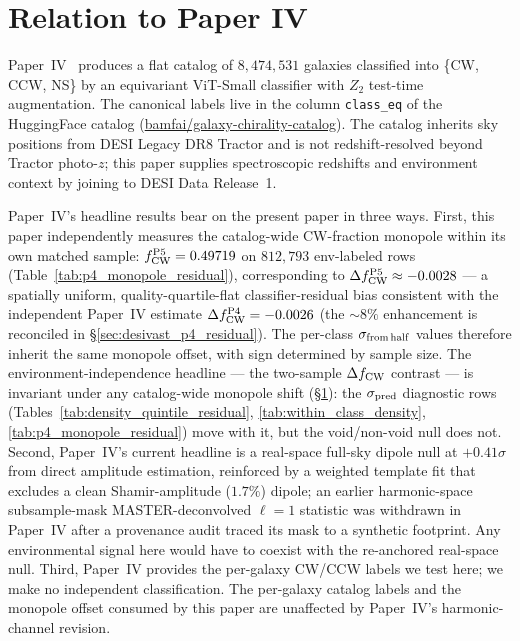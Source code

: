 \documentclass[aps,prd,twocolumn,superscriptaddress,showpacs,preprintnumbers,nofootinbib,longbibliography,floatfix]{revtex4-2}
\begin{document}
\section{Relation to Paper IV}\label{sec:p4}

Paper~IV~\cite{golden_chirality_2026} produces a flat catalog of
$8{,}474{,}531$ galaxies classified into \{CW, CCW, NS\} by an
equivariant ViT-Small classifier with $Z_2$ test-time augmentation.
The canonical labels live in the column \texttt{class\_eq} of the
HuggingFace catalog
(\href{https://huggingface.co/datasets/bamfai/galaxy-chirality-catalog}%
{bamfai/galaxy-chirality-catalog}). The catalog inherits sky positions from
DESI Legacy DR8 Tractor and is not redshift-resolved beyond Tractor
photo-$z$; this paper supplies spectroscopic redshifts and environment
context by joining to DESI Data Release~1.

Paper~IV's headline results bear on the present paper in three ways.
First, this paper independently measures the catalog-wide CW-fraction
monopole within its own matched sample: $f_{\rm CW}^{\rm P5} =
0.49719$ on $812{,}793$ env-labeled rows
(Table~\ref{tab:p4_monopole_residual}), corresponding to
$\Delta f_{\rm CW}^{\rm P5} \approx -0.0028$ --- a spatially uniform,
quality-quartile-flat classifier-residual bias consistent with the
independent Paper~IV estimate $\Delta f_{\rm CW}^{\rm P4} = -0.0026$
(the ${\sim}8\%$ enhancement is reconciled in \S\ref{sec:desivast_p4_residual}).
The per-class $\sigma_{\rm from\,half}$ values therefore inherit the
same monopole offset, with sign determined by sample size. The
environment-independence headline --- the two-sample $\Delta f_{\rm CW}$
contrast --- is invariant under any catalog-wide monopole shift
(\S\ref{sec:p4}): the $\sigma_{\rm pred}$ diagnostic rows
(Tables~\ref{tab:density_quintile_residual},
\ref{tab:within_class_density}, \ref{tab:p4_monopole_residual}) move
with it, but the void/non-void null does not. Second,
Paper~IV's current headline is a real-space full-sky dipole
null at $+0.41\sigma$ from direct amplitude estimation,
reinforced by a weighted template fit that excludes a clean
Shamir-amplitude ($1.7\%$) dipole; an earlier harmonic-space
subsample-mask MASTER-deconvolved $\ell\!=\!1$ statistic was withdrawn
in Paper~IV after a provenance audit traced its mask to a
synthetic footprint. Any environmental signal
here would have to coexist with the re-anchored real-space null. Third,
Paper~IV provides
the per-galaxy CW/CCW labels we test here; we make no independent
classification. The per-galaxy catalog labels and the monopole offset
consumed by this paper are unaffected by Paper~IV's harmonic-channel
revision.
\end{document}
